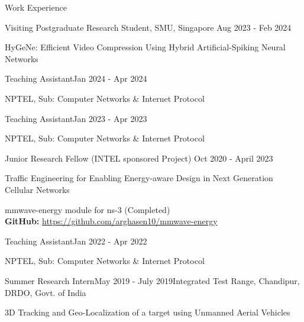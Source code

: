\documentclass{resume} %
\begin{document}
	
	\begin{rSection}{Work Experience}
		
%			
%			
%			 
%			
		\begin{rSubsection}{Visiting Postgraduate Research Student, SMU, Singapore}  
			{Aug 2023 - Feb 2024}{}{}
			\item HyGeNe: Efficient Video Compression Using Hybrid Artificial-Spiking Neural Networks\\
		\end{rSubsection}
		\begin{rSubsection}{Teaching Assistant}{Jan 2024 - Apr 2024}{}{}
			\item NPTEL, Sub: Computer Networks \& Internet Protocol
		\end{rSubsection}
		
		\begin{rSubsection}{Teaching Assistant}{Jan 2023 - Apr 2023}{}{}
			\item NPTEL, Sub: Computer Networks \& Internet Protocol
		\end{rSubsection}
		
		\begin{rSubsection}{Junior Research Fellow (INTEL sponsored Project)}  
			{Oct 2020 - April 2023}{}{}
				\item Traffic Engineering for Enabling Energy-aware Design in Next Generation Cellular Networks
				\item mmwave-energy module for ns-3 (Completed)\\
				\textbf{GitHub:} \url{https://github.com/arghasen10/mmwave-energy}
		\end{rSubsection}
		
		\begin{rSubsection}{Teaching Assistant}{Jan 2022 - Apr 2022}{}{}
				\item NPTEL, Sub: Computer Networks \& Internet Protocol
		\end{rSubsection}
		
		
		\begin{rSubsection}{Summer Research Intern}{May 2019 - July 2019}{Integrated Test Range, Chandipur, DRDO, Govt. of India}{}{}
				\item 3D Tracking and Geo-Localization of a target using Unmanned Aerial Vehicles\\
		\end{rSubsection}
		

\end{rSection}
\end{document}
